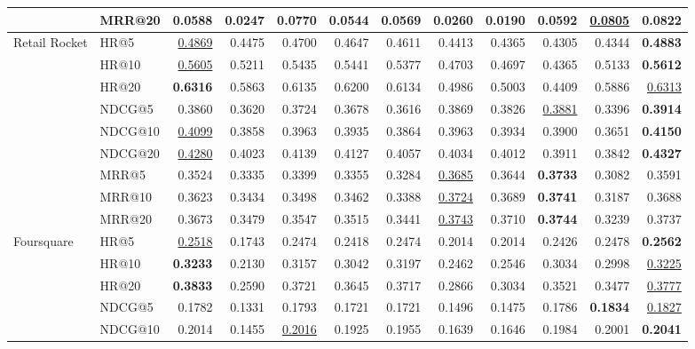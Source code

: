 \documentclass[sigconf,review,anonymous]{acmart}
\newcommand{\tblbest}[1]{\textbf{#1}}
\newcommand{\tblsecond}[1]{\underline{#1}}
\begin{document}
\begin{table}[t]
{\begin{tabular}{llrrrrrrrrrr}
      & MRR@20  & 0.0588 & 0.0247 & 0.0770 & 0.0544 & 0.0569 & 0.0260 & 0.0190 & 0.0592 & \tblsecond{0.0805} & \tblbest{0.0822} \\
    \midrule
    \multirow{9}{*}{Retail Rocket}
      & HR@5    & \tblsecond{0.4869} & 0.4475 & 0.4700 & 0.4647 & 0.4611 & 0.4413 & 0.4365 & 0.4305 & 0.4344 & \tblbest{0.4883} \\
      & HR@10   & \tblsecond{0.5605} & 0.5211 & 0.5435 & 0.5441 & 0.5377 & 0.4703 & 0.4697 & 0.4365 & 0.5133 & \tblbest{0.5612} \\
      & HR@20   & \tblbest{0.6316} & 0.5863 & 0.6135 & 0.6200 & 0.6134 & 0.4986 & 0.5003 & 0.4409 & 0.5886 & \tblsecond{0.6313} \\
      & NDCG@5  & 0.3860 & 0.3620 & 0.3724 & 0.3678 & 0.3616 & 0.3869 & 0.3826 & \tblsecond{0.3881} & 0.3396 & \tblbest{0.3914} \\
      & NDCG@10 & \tblsecond{0.4099} & 0.3858 & 0.3963 & 0.3935 & 0.3864 & 0.3963 & 0.3934 & 0.3900 & 0.3651 & \tblbest{0.4150} \\
      & NDCG@20 & \tblsecond{0.4280} & 0.4023 & 0.4139 & 0.4127 & 0.4057 & 0.4034 & 0.4012 & 0.3911 & 0.3842 & \tblbest{0.4327} \\
      & MRR@5   & 0.3524 & 0.3335 & 0.3399 & 0.3355 & 0.3284 & \tblsecond{0.3685} & 0.3644 & \tblbest{0.3733} & 0.3082 & 0.3591 \\
      & MRR@10  & 0.3623 & 0.3434 & 0.3498 & 0.3462 & 0.3388 & \tblsecond{0.3724} & 0.3689 & \tblbest{0.3741} & 0.3187 & 0.3688 \\
      & MRR@20  & 0.3673 & 0.3479 & 0.3547 & 0.3515 & 0.3441 & \tblsecond{0.3743} & 0.3710 & \tblbest{0.3744} & 0.3239 & 0.3737 \\
    \midrule
    \multirow{9}{*}{Foursquare}
      & HR@5    & \tblsecond{0.2518} & 0.1743 & 0.2474 & 0.2418 & 0.2474 & 0.2014 & 0.2014 & 0.2426 & 0.2478 & \tblbest{0.2562} \\
      & HR@10   & \tblbest{0.3233} & 0.2130 & 0.3157 & 0.3042 & 0.3197 & 0.2462 & 0.2546 & 0.3034 & 0.2998 & \tblsecond{0.3225} \\
      & HR@20   & \tblbest{0.3833} & 0.2590 & 0.3721 & 0.3645 & 0.3717 & 0.2866 & 0.3034 & 0.3521 & 0.3477 & \tblsecond{0.3777} \\
      & NDCG@5  & 0.1782 & 0.1331 & 0.1793 & 0.1721 & 0.1721 & 0.1496 & 0.1475 & 0.1786 & \tblbest{0.1834} & \tblsecond{0.1827} \\
      & NDCG@10 & 0.2014 & 0.1455 & \tblsecond{0.2016} & 0.1925 & 0.1955 & 0.1639 & 0.1646 & 0.1984 & 0.2001 & \tblbest{0.2041} \\

\end{tabular}}
\end{table}
\end{document}
